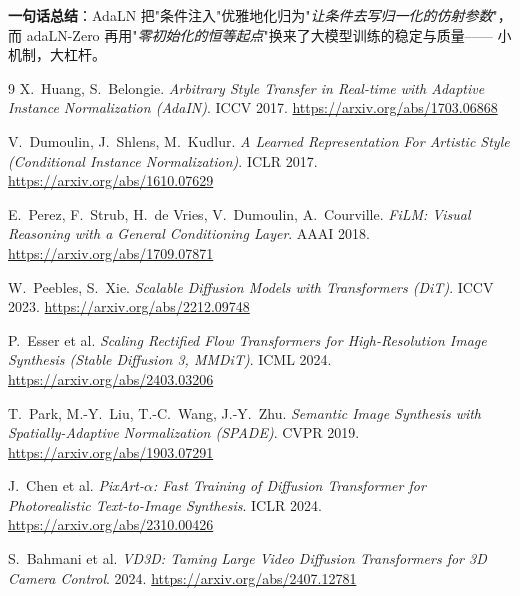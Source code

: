 \documentclass[11pt]{ctexart}
\theoremstyle{definition}
\begin{document}
\bigskip
\noindent\textbf{一句话总结}：AdaLN 把"条件注入"优雅地化归为"\emph{让条件去写归一化的仿射参数}"，
而 adaLN-Zero 再用"\emph{零初始化的恒等起点}"换来了大模型训练的稳定与质量——
小机制，大杠杆。

\begin{thebibliography}{9}
 X.~Huang, S.~Belongie.
\emph{Arbitrary Style Transfer in Real-time with Adaptive Instance Normalization (AdaIN)}. ICCV 2017.
\url{https://arxiv.org/abs/1703.06868}

 V.~Dumoulin, J.~Shlens, M.~Kudlur.
\emph{A Learned Representation For Artistic Style (Conditional Instance Normalization)}. ICLR 2017.
\url{https://arxiv.org/abs/1610.07629}

 E.~Perez, F.~Strub, H.~de Vries, V.~Dumoulin, A.~Courville.
\emph{FiLM: Visual Reasoning with a General Conditioning Layer}. AAAI 2018.
\url{https://arxiv.org/abs/1709.07871}

 W.~Peebles, S.~Xie.
\emph{Scalable Diffusion Models with Transformers (DiT)}. ICCV 2023.
\url{https://arxiv.org/abs/2212.09748}

 P.~Esser et al.
\emph{Scaling Rectified Flow Transformers for High-Resolution Image Synthesis (Stable Diffusion 3, MMDiT)}. ICML 2024.
\url{https://arxiv.org/abs/2403.03206}

 T.~Park, M.-Y.~Liu, T.-C.~Wang, J.-Y.~Zhu.
\emph{Semantic Image Synthesis with Spatially-Adaptive Normalization (SPADE)}. CVPR 2019.
\url{https://arxiv.org/abs/1903.07291}

 J.~Chen et al.
\emph{PixArt-$\alpha$: Fast Training of Diffusion Transformer for Photorealistic Text-to-Image Synthesis}. ICLR 2024.
\url{https://arxiv.org/abs/2310.00426}

 S.~Bahmani et al.
\emph{VD3D: Taming Large Video Diffusion Transformers for 3D Camera Control}. 2024.
\url{https://arxiv.org/abs/2407.12781}
\end{thebibliography}
\end{document}
